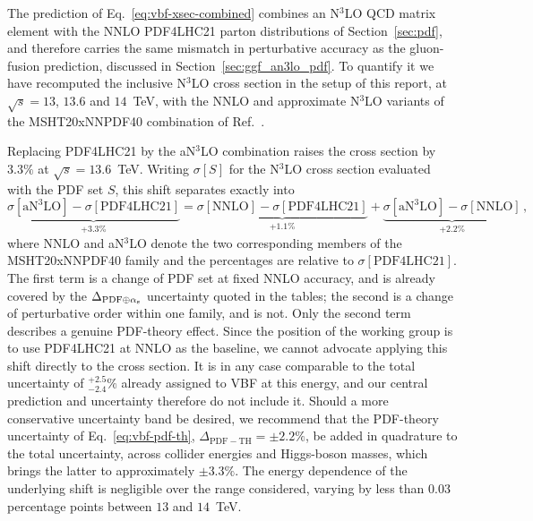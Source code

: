 The prediction of Eq.~\eqref{eq:vbf-xsec-combined} combines an N$^3$LO QCD
matrix element with the NNLO PDF4LHC21 parton distributions of
Section~\ref{sec:pdf}, and therefore carries the same mismatch in perturbative
accuracy as the gluon-fusion prediction, discussed in
Section~\ref{sec:ggf_an3lo_pdf}. To quantify it we have recomputed the
inclusive N$^3$LO cross section in the setup of this report, at
$\sqrt{s}=13$, $13.6$ and $14$~TeV, with the NNLO and approximate N$^3$LO
variants of the MSHT20xNNPDF40 combination of Ref.~\cite{Cridge:2024icl}.

Replacing PDF4LHC21 by the aN$^3$LO combination raises the cross
section by $3.3\%$ at $\sqrt{s}=13.6$~TeV. 
Writing $\sigma[S]$ for the N$^3$LO cross section evaluated with the PDF
set $S$, this shift separates exactly into
%
\begin{equation}
  \underbrace{\sigma[\mathrm{aN}^3\mathrm{LO}]-\sigma[\mathrm{PDF4LHC21}]}_{+3.3\%}
  = \underbrace{\sigma[\mathrm{NNLO}]-\sigma[\mathrm{PDF4LHC21}]}_{+1.1\%}
  + \underbrace{\sigma[\mathrm{aN}^3\mathrm{LO}]-\sigma[\mathrm{NNLO}]}_{+2.2\%}\,,
  \label{eq:vbf-pdf-th}
\end{equation}
%
where NNLO and aN$^3$LO denote the two corresponding members of the
MSHT20xNNPDF40 family and the percentages are relative to
$\sigma[\mathrm{PDF4LHC21}]$.
The first term is a change of PDF set at fixed NNLO accuracy, and is
already covered by the $\Delta_{\mathrm{PDF}\oplus\alpha_{\mathrm{s}}}$ uncertainty
quoted in the tables; the second is a change of perturbative order within
one family, and is not.
Only the second term describes a genuine PDF-theory effect. Since the position of the working group is to use PDF4LHC21 at
NNLO as the baseline, we cannot advocate applying this shift directly
to the cross section. It is in any case comparable to the total
uncertainty of $^{+2.5}_{-2.4}\%$ already assigned to VBF at this
energy, and our central prediction and uncertainty therefore do not
include it. Should a more conservative uncertainty band be desired, we
recommend that the PDF-theory uncertainty of Eq.~\eqref{eq:vbf-pdf-th},
$\Delta_{\mathrm{PDF-TH}} = \pm 2.2\%$, be added in quadrature to the
total uncertainty, across collider energies and Higgs-boson masses,
which brings the latter to approximately $\pm 3.3\%$. The energy dependence of the underlying shift is
negligible over the range considered, varying by less than $0.03$
percentage points between $13$ and $14$~TeV.

